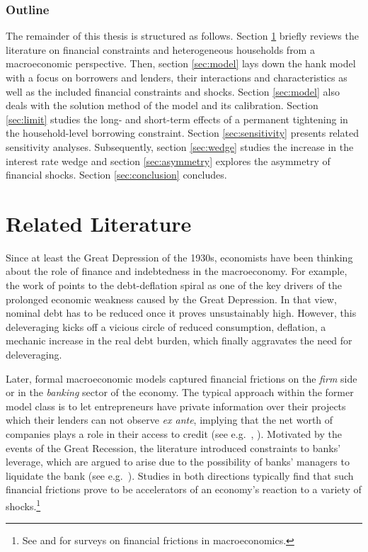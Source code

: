 \documentclass[a4paper,12pt]{article} %
\numberwithin{equation}{section} %
\numberwithin{figure}{section}
\numberwithin{table}{section}
\begin{document}
\subsubsection*{Outline}
\label{sec:outline}
The remainder of this thesis is structured as follows. Section \ref{sec:literature} briefly reviews the literature on financial constraints and heterogeneous households from a macroeconomic perspective. Then, section \ref{sec:model} lays down the \Gls{hank} model with a focus on borrowers and lenders, their interactions and characteristics as well as the included financial constraints and shocks. Section \ref{sec:model} also deals with the solution method of the model and its calibration. Section \ref{sec:limit} studies the long- and short-term effects of a permanent tightening in the household-level borrowing constraint. Section \ref{sec:sensitivity} presents related sensitivity analyses. Subsequently, section \ref{sec:wedge} studies the increase in the interest rate wedge and section \ref{sec:asymmetry} explores the asymmetry of financial shocks. Section \ref{sec:conclusion} concludes.

\section{Related Literature}
\label{sec:literature}

Since at least the Great Depression of the 1930s, economists have been thinking about the role of finance and indebtedness in the macroeconomy. For example, the work of \textcite{fisher1933} points to the debt-deflation spiral as one of the key drivers of the prolonged economic weakness caused by the Great Depression. In that view, nominal debt has to be reduced once it proves unsustainably high. However, this deleveraging kicks off a vicious circle of reduced consumption, deflation, a mechanic increase in the real debt burden, which finally aggravates the need for deleveraging.

Later, formal macroeconomic models captured financial frictions on the \textit{firm} side or in the \textit{banking} sector of the economy. The typical approach within the former model class is to let entrepreneurs have private information over their projects which their lenders can not observe \textit{ex ante}, implying that the net worth of companies plays a role in their access to credit (see e.g.~\cite{bg1989}, \cite{bgg1999}). Motivated by the events of the Great Recession, the literature introduced constraints to banks' leverage, which are argued to arise due to the possibility of banks' managers to liquidate the bank (see e.g.~\cite{gertler2011}). Studies in both directions typically find that such financial frictions prove to be accelerators of an economy's reaction to a variety of shocks.\footnote{See \textcite{brunnermeier2012} and \textcite{christiano2022} for surveys on financial frictions in macroeconomics.}
\end{document}
